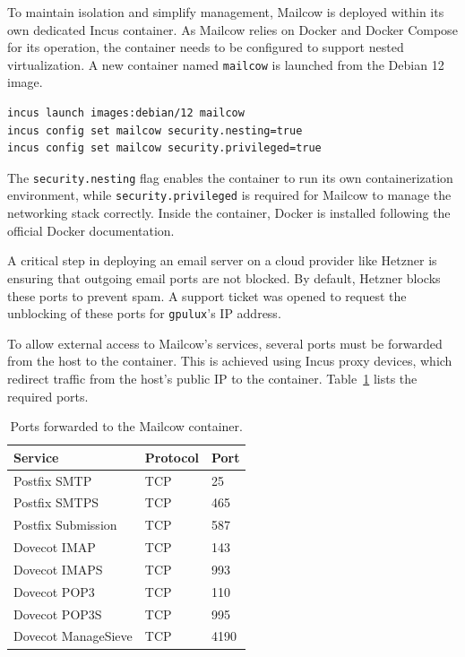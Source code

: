 To maintain isolation and simplify management, Mailcow is deployed within its own dedicated Incus container. As Mailcow relies on Docker and Docker Compose for its operation, the container needs to be configured to support nested virtualization\cite{incus-faq-docker-nesting}. A new container named \texttt{mailcow} is launched from the Debian 12 image.

\begin{lstlisting}[language=bash,caption={Creating and configuring the Mailcow container.}]
incus launch images:debian/12 mailcow
incus config set mailcow security.nesting=true
incus config set mailcow security.privileged=true
\end{lstlisting}

The \texttt{security.nesting} flag enables the container to run its own containerization environment, while \texttt{security.privileged} is required for Mailcow to manage the networking stack correctly. Inside the container, Docker is installed following the official Docker documentation.

A critical step in deploying an email server on a cloud provider like Hetzner is ensuring that outgoing email ports are not blocked. By default, Hetzner blocks these ports to prevent spam. A support ticket was opened to request the unblocking of these ports for \texttt{gpulux}'s IP address.

To allow external access to Mailcow's services, several ports must be forwarded from the host to the container. This is achieved using Incus proxy devices, which redirect traffic from the host's public IP to the container. Table~\ref{tab:mailcow-ports} lists the required ports.

\begin{table}[H]
    \centering
    \caption{Ports forwarded to the Mailcow container\cite{mailcow-prerequisites}.}
    \label{tab:mailcow-ports}
    \begin{tabular}{lll}
        \rowcolor{udcpink!25}
        \textbf{Service} & \textbf{Protocol} & \textbf{Port} \\
        \hline
        Postfix SMTP & TCP & 25 \\
        Postfix SMTPS & TCP & 465 \\
        Postfix Submission & TCP & 587 \\
        Dovecot IMAP & TCP & 143 \\
        Dovecot IMAPS & TCP & 993 \\
        Dovecot POP3 & TCP & 110 \\
        Dovecot POP3S & TCP & 995 \\
        Dovecot ManageSieve & TCP & 4190 \\
    \end{tabular}
\end{table}

